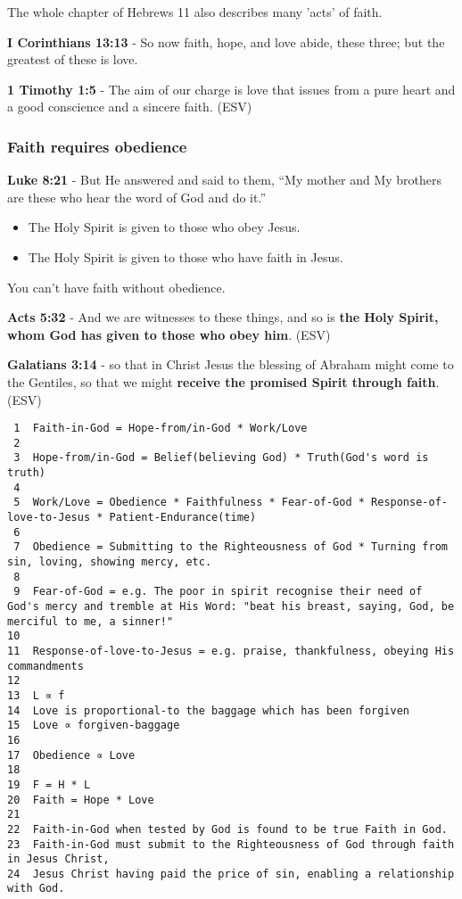\documentclass[11pt]{article}
\begin{document}
The whole chapter of Hebrews 11 also describes many 'acts' of faith.

\textbf{I Corinthians 13:13} - So now faith, hope, and love abide, these three; but the greatest of these is love.

\textbf{1 Timothy 1:5} -  The aim of our charge is love that issues from a pure heart and a good conscience and a sincere faith.  (ESV)

\subsubsection{Faith requires obedience}
\label{sec:org5f23372}
\textbf{Luke 8:21} - But He answered and said to them, “My mother and My brothers are these who hear the word of God and do it.”

\begin{itemize}
\item The Holy Spirit is given to those who obey Jesus.
\item The Holy Spirit is given to those who have faith in Jesus.
\end{itemize}

You can't have faith without obedience.

\textbf{Acts 5:32} - And we are witnesses to these things, and so is \textbf{the Holy Spirit, whom God has given to those who obey him}. (ESV)

\textbf{Galatians 3:14} - so that in Christ Jesus the blessing of Abraham might come to the Gentiles, so that we might \textbf{receive the promised Spirit through faith}. (ESV)

\begin{verbatim}
 1  Faith-in-God = Hope-from/in-God * Work/Love
 2  
 3  Hope-from/in-God = Belief(believing God) * Truth(God's word is truth)
 4  
 5  Work/Love = Obedience * Faithfulness * Fear-of-God * Response-of-love-to-Jesus * Patient-Endurance(time)
 6  
 7  Obedience = Submitting to the Righteousness of God * Turning from sin, loving, showing mercy, etc.
 8  
 9  Fear-of-God = e.g. The poor in spirit recognise their need of God's mercy and tremble at His Word: "beat his breast, saying, God, be merciful to me, a sinner!"
10  
11  Response-of-love-to-Jesus = e.g. praise, thankfulness, obeying His commandments
12  
13  L ∝ f
14  Love is proportional-to the baggage which has been forgiven
15  Love ∝ forgiven-baggage
16  
17  Obedience ∝ Love
18  
19  F = H * L
20  Faith = Hope * Love
21  
22  Faith-in-God when tested by God is found to be true Faith in God.
23  Faith-in-God must submit to the Righteousness of God through faith in Jesus Christ,
24  Jesus Christ having paid the price of sin, enabling a relationship with God.
\end{verbatim}
\end{document}
